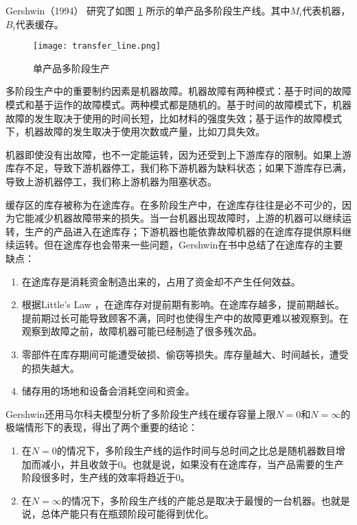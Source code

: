 Gershwin（1994） \cite{gershwin_manufacturing_1994} 研究了如图 \ref{fig:transfer_line} 所示的单产品多阶段生产线。其中$M_i$代表机器，$B_i$代表缓存。

\begin{figure}[htbp]
\centering
\texttt{[image: transfer\_line.png]}
\caption{单产品多阶段生产}
\label{fig:transfer_line}
\end{figure}

多阶段生产中的重要制约因素是机器故障。机器故障有两种模式：基于时间的故障模式和基于运作的故障模式。两种模式都是随机的。基于时间的故障模式下，机器故障的发生取决于使用的时间长短，比如材料的强度失效；基于运作的故障模式下，机器故障的发生取决于使用次数或产量，比如刀具失效。

机器即使没有出故障，也不一定能运转，因为还受到上下游库存的限制。如果上游库存不足，导致下游机器停工，我们称下游机器为缺料状态；如果下游库存已满，导致上游机器停工，我们称上游机器为阻塞状态。

缓存区的库存被称为在途库存。在多阶段生产中，在途库存往往是必不可少的，因为它能减少机器故障带来的损失。当一台机器出现故障时，上游的机器可以继续运转，生产的产品进入在途库存；下游机器也能依靠故障机器的在途库存提供原料继续运转。但在途库存也会带来一些问题，Gershwin在书中总结了在途库存的主要缺点：
\begin{enumerate}
\item
在途库存是消耗资金制造出来的，占用了资金却不产生任何效益。
\item
根据Little's Law \cite{little_proof_1961} ，在途库存对提前期有影响。在途库存越多，提前期越长。提前期过长可能导致顾客不满，同时也使得生产中的故障更难以被观察到。在观察到故障之前，故障机器可能已经制造了很多残次品。
\item
零部件在库存期间可能遭受破损、偷窃等损失。库存量越大、时间越长，遭受的损失越大。
\item
储存用的场地和设备会消耗空间和资金。
\end{enumerate}

Gershwin还用马尔科夫模型分析了多阶段生产线在缓存容量上限$N=0$和$N=\infty$的极端情形下的表现，得出了两个重要的结论：
\begin{enumerate}
\item
在$N=0$的情况下，多阶段生产线的运作时间与总时间之比总是随机器数目增加而减小，并且收敛于0。也就是说，如果没有在途库存，当产品需要的生产阶段很多时，生产线的效率将趋近于0。
\item
在$N=\infty$的情况下，多阶段生产线的产能总是取决于最慢的一台机器。也就是说，总体产能只有在瓶颈阶段可能得到优化。
\end{enumerate}


